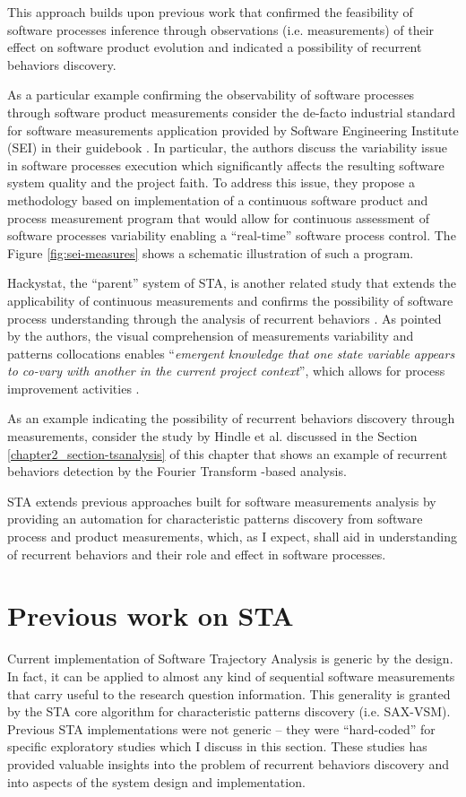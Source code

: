 This approach builds upon previous work that confirmed the feasibility of software processes inference through 
observations (i.e. measurements) of their effect on software product evolution and indicated a possibility of 
recurrent behaviors discovery. 

As a particular example confirming the observability of software processes through software product measurements 
consider the de-facto industrial standard for software measurements application provided by 
Software Engineering Institute (SEI) in their guidebook \cite{citeulike:10567306}. 
In particular, the authors discuss the variability issue in software processes execution which significantly 
affects the resulting software system quality and the project faith. 
To address this issue, they propose a methodology based on implementation of a continuous software product 
and process measurement program that would allow for continuous assessment of software processes 
variability enabling a ``real-time'' software process control. The Figure \ref{fig:sei-measures} shows a schematic 
illustration of such a program.

Hackystat, the ``parent'' system of STA, is another related study that extends the applicability of continuous 
measurements and confirms the possibility of software process understanding through the analysis of recurrent 
behaviors \cite{citeulike:557296}. 
As pointed by the authors, the visual comprehension of measurements variability and patterns collocations enables 
``\textit{emergent knowledge that one state variable appears to co-vary with another in the current project context}'',
which allows for process improvement activities \cite{citeulike:557296}. 

As an example indicating the possibility of recurrent behaviors discovery through measurements, consider the 
study by Hindle et al. \cite{citeulike:10377345} discussed in the Section \ref{chapter2_section-tsanalysis} of 
this chapter that shows an example of recurrent behaviors detection by the Fourier Transform -based analysis.

STA extends previous approaches built for software measurements analysis by providing an automation for 
characteristic patterns discovery from software process and product measurements, which, as I expect, shall 
aid in understanding of recurrent behaviors and their role and effect in software processes.

\section{Previous work on STA}
Current implementation of Software Trajectory Analysis is generic by the design. In fact, it can be applied 
to almost any kind of sequential software measurements that carry useful to the research question information. 
This generality is granted by the STA core algorithm for characteristic patterns discovery (i.e. SAX-VSM). 
Previous STA implementations were not generic -- they were ``hard-coded'' for specific exploratory studies 
which I discuss in this section. These studies has provided valuable insights into the problem of recurrent 
behaviors discovery and into aspects of the system design and implementation.

